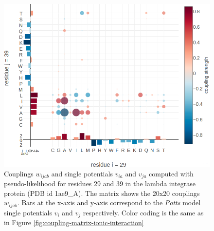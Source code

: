 \documentclass[11pt,a4paper,twoside]{book}
\newcommand{\vi}{v_{i}}
\newcommand{\vj}{v_{j}}
\newcommand{\via}{v_{ia}}
\newcommand{\vja}{v_{ja}}
\newcommand{\wijab}{w_{ijab}}
\theoremstyle{definition}
\theoremstyle{definition}
\theoremstyle{remark}
\begin{document}
\begin{figure}
\includegraphics[width=1\linewidth]{img/coupling_matrix_analysis/coupling_matrix_1ae9A00_29_39_notitle} \caption{Couplings
\(\wijab\) and single potentials \(\via\) and \(\vja\) computed with
pseudo-likelihood for residues 29 and 39 in the lambda integrase protein
(PDB id 1ae9\_A). The matrix shows the 20x20 couplings \(\wijab\). Bars
at the x-axis and y-axis correspond to the \emph{Potts} model single
potentials \(\vi\) and \(\vj\) respectively. Color coding is the same as
in Figure \ref{fig:coupling-matrix-ionic-interaction}}\label{fig:coupling-matrix-hydrophobic-interaction}
\end{figure}
\end{document}
